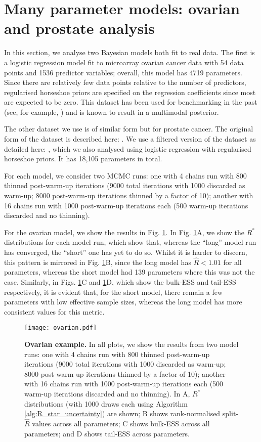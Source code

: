 \documentclass{article}
\begin{document}
\section{Many parameter models: ovarian and prostate analysis}\label{sec:prostate}
In this section, we analyse two Bayesian models both fit to real data. The first is a logistic regression model fit to microarray ovarian cancer data with 54 data points and 1536 predictor variables; overall, this model has 4719 parameters. Since there are relatively few data points relative to the number of predictors, regularised horseshoe priors are specified on the regression coefficients \citep{piironen2017sparsity} since most are expected to be zero. This dataset has been used for benchmarking in the past (see, for example, \cite{schummer1999comparative,hernandez2010expectation,paananen2019implicitly}) and is known to result in a multimodal posterior.

The other dataset we use is of similar form but for prostate cancer. The original form of the dataset is described here: \cite{singh2002gene}. We use a filtered version of the dataset as detailed here: \cite{yang2006stable}, which we also analysed using logistic regression with regularised horseshoe priors. It has 18,105 parameters in total. 

For each model, we consider two MCMC runs: one with 4 chains run with 800 thinned post-warm-up iterations (9000 total iterations with 1000 discarded as warm-up; 8000 post-warm-up iterations thinned by a factor of 10); another with 16 chains run with 1000 post-warm-up iterations each (500 warm-up iterations discarded and no thinning).

For the ovarian model, we show the results in Fig. \ref{fig:ovarian}. In Fig. \ref{fig:ovarian}A, we show the $R^*$ distributions for each model run, which show that, whereas the ``long'' model run has converged, the ``short'' one has yet to do so. Whilst it is harder to discern, this pattern is mirrored in Fig. \ref{fig:ovarian}B, since the long model has $\widehat{R}<1.01$ for all parameters, whereas the short model had 139 parameters where this was not the case. Similarly, in Figs. \ref{fig:ovarian}C and \ref{fig:ovarian}D, which show the bulk-ESS and tail-ESS respectively, it is evident that, for the short model, there remain a few parameters with low effective sample sizes, whereas the long model has more consistent values for this metric.

\begin{figure}[!htb]
	\centerline{\texttt{[image: ovarian.pdf]}}
	\caption{\textbf{Ovarian example.} In all plots, we show the results from two model runs: one with 4 chains run with 800 thinned post-warm-up iterations (9000 total iterations with 1000 discarded as warm-up; 8000 post-warm-up iterations thinned by a factor of 10); another with 16 chains run with 1000 post-warm-up iterations each (500 warm-up iterations discarded and no thinning). In A, $R^*$ distributions (with 1000 draws each using Algorithm \ref{alg:R_star_uncertainty}) are shown; B shows rank-normalised split-$\widehat{R}$ values across all parameters; C shows bulk-ESS across all parameters; and D shows tail-ESS across parameters.}
	\label{fig:ovarian}
\end{figure}
\end{document}
